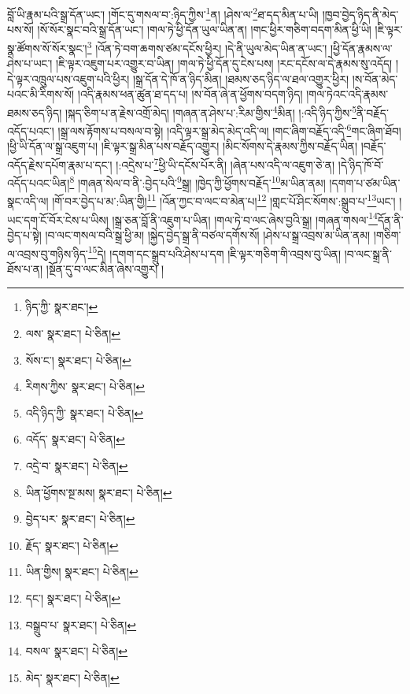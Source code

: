 བློ་ཡི་རྣམ་པའི་སྒྲ་དོན་ཡང་། །གོང་དུ་གསལ་བ་:ཉིད་ཀྱིས་\footnote{ཉིད་ཀྱི་  སྣར་ཐང་། }ན། །ཤེས་ལ་\footnote{ལས་  སྣར་ཐང་།  པེ་ཅིན། }ཐ་དད་མིན་པ་ཡི། །ཁྱབ་བྱེད་ཉིད་ནི་མེད་པས་སོ། །སོ་སོར་སྣང་བའི་སྒྲ་དོན་ཡང་། །གལ་ཏེ་ཕྱི་དོན་ཡུལ་ཡིན་ན། །གང་ཕྱིར་གཅིག་བདག་མིན་ཕྱི་ཡི། །ཇི་ལྟར་སྣ་ཚོགས་སོ་སོར་སྣང་།\footnote{སོས་ང་།  སྣར་ཐང་།  པེ་ཅིན། } །འོན་ཏེ་བག་ཆགས་ཙམ་དངོས་ཕྱིར། །དེ་ནི་ཡུལ་མེད་ཡིན་ན་ཡང་། །ཕྱི་དོན་རྣམས་ལ་ཤེས་པ་ཡང་། །ཇི་ལྟར་འཇུག་པར་འགྱུར་བ་ཡིན། །གལ་ཏེ་ཕྱི་དོན་དུ་ངེས་པས། །རང་དངོས་ལ་དེ་རྣམས་སུ་འདོད། །དེ་ལྟར་འཁྲུལ་པས་འཇུག་པའི་ཕྱིར། །སྒྲ་དོན་དེ་ཁོ་ན་ཉིད་མིན། །ཐམས་ཅད་ཉིད་ལ་ཐལ་འགྱུར་ཕྱིར། །ས་བོན་མེད་པའང་མི་རིགས་སོ། །འདི་རྣམས་ཕན་ཚུན་ཐ་དད་པ། །ས་བོན་ཞེ་ན་ཕྱོགས་བདག་ཉིད། །གལ་ཏེའང་འདི་རྣམས་ཐམས་ཅད་ཉིད། །སྐད་ཅིག་པ་ན་རྗེས་འགྲོ་མེད། །གཞན་ན་ཤེས་པ་:རིམ་གྱིས་\footnote{རིགས་ཀྱིས་  སྣར་ཐང་།  པེ་ཅིན། }མིན། །:འདི་ཉིད་ཀྱིས་\footnote{འདི་ཉིད་ཀྱི་  སྣར་ཐང་།  པེ་ཅིན། }ནི་བརྗོད་འདོད་པའང་། །སྒྲ་ལས་རྟོགས་པ་བསལ་བ་སྟེ། །འདི་ལྟར་སྒྲ་མེད་མེད་འདི་ལ། །གང་ཞིག་བརྗོད་འདི་\footnote{འདོད་  སྣར་ཐང་།  པེ་ཅིན། }གང་ཞིག་ཐོབ། །ཕྱི་ཡི་དོན་ལ་སྒྲ་འཇུག་པ། །ཇི་ལྟར་སྒྲ་མིན་པས་བརྗོད་འགྱུར། །མིང་སོགས་དེ་རྣམས་ཀྱིས་བརྗོད་ཡིན། །བརྗོད་འདོད་རྗེས་དཔོག་རྣམ་པ་དང་། །:འདྲེས་པ་\footnote{འདྲེ་བ་  སྣར་ཐང་།  པེ་ཅིན། }ཕྱི་ཡི་དངོས་པོར་ནི། །ཞེན་པས་འདི་ལ་འཇུག་ཅེ་ན། །དེ་ཉིད་ཁོ་བོ་འདོད་པའང་ཡིན།\footnote{ཡིན་ཕྱོགས་སྔ་མས།  སྣར་ཐང་།  པེ་ཅིན། } །གཞན་སེལ་བ་ནི་:བྱེད་པའི་\footnote{བྱེད་པར་  སྣར་ཐང་།  པེ་ཅིན། }སྒྲ། །ཁྱེད་ཀྱི་ཕྱོགས་བརྗོད་\footnote{རྗོད་  སྣར་ཐང་།  པེ་ཅིན། }མ་ཡིན་ནམ། །དགག་པ་ཙམ་ཡིན་སྣང་འདི་ལ། །གོ་བར་བྱེད་པ་མ་:ཡིན་གྱི།\footnote{ཡིན་གྱིས།  སྣར་ཐང་།  པེ་ཅིན། } །འོན་ཀྱང་བ་ལང་བ་མེན་པ།\footnote{དང་།  སྣར་ཐང་།  པེ་ཅིན། } །གླང་པོ་ཤིང་སོགས་:སྒྲུབ་པ་\footnote{བསྒྲུབ་པ་  སྣར་ཐང་།  པེ་ཅིན། }ཡང་། །ཡང་དག་ངོ་བོར་ངེས་པ་ཡིས། །སྒྲ་ཅན་བློ་ནི་འཇུག་པ་ཡིན། །གལ་ཏེ་བ་ལང་ཞེས་བྱའི་སྒྲ། །གཞན་གསལ་\footnote{བསལ་  སྣར་ཐང་།  པེ་ཅིན། }དོན་ནི་བྱེད་པ་སྟེ། །བ་ལང་གསལ་བའི་སྒྲ་ཕྱི་མ། །སྐྱེད་བྱེད་སྒྲ་ནི་བཙལ་དགོས་སོ། །ཤེས་པ་སྒྲ་འབྲས་མ་ཡིན་ནམ། །གཅིག་ལ་འབྲས་བུ་གཉིས་ཉིད་\footnote{མེད་  སྣར་ཐང་།  པེ་ཅིན། }དེ། །དགག་དང་སྒྲུབ་པའི་ཤེས་པ་དག །ཇི་ལྟར་གཅིག་གི་འབྲས་བུ་ཡིན། །བ་ལང་སྒྲ་ནི་ཐོས་པ་ན། །སྔོན་དུ་བ་ལང་མིན་ཞེས་འགྱུར། །
